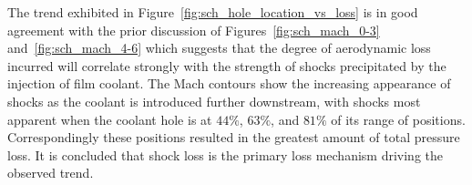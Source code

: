 \documentclass[a4paper, 11pt, oneside]{report}
\begin{document}
The trend exhibited in Figure~\ref{fig:sch_hole_location_vs_loss} is in good agreement with the prior discussion of Figures~\ref{fig:sch_mach_0-3} and~\ref{fig:sch_mach_4-6} which suggests that the degree of aerodynamic loss incurred will correlate strongly with the strength of shocks precipitated by the injection of film coolant. The Mach contours show the increasing appearance of shocks as the coolant is introduced further downstream, with shocks most apparent when the coolant hole is at $44\%$, $63\%$, and $81\%$ of its range of positions. Correspondingly these positions resulted in the greatest amount of total pressure loss. It is concluded that shock loss is the primary loss mechanism driving the observed trend.
    
    
    
    

    






\end{document}
